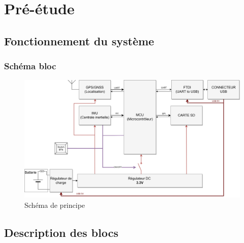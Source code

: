 \section{Pré-étude} \label{sec:Pre-Etude}

\subsection{Fonctionnement du système} \label{ssec:Fonctionnement}

\subsubsection{Schéma bloc} \label{sssec:Schema-bloc}
\begin{figure}[h]
	\centering
	\includegraphics[width=1\textwidth]{../figures/cdc/blocs_grossiers_no_antenna.jpg}
	\caption{Schéma de principe}
	\label{fig:blocsgrossiers}
\end{figure}
\subsection{Description des blocs}

